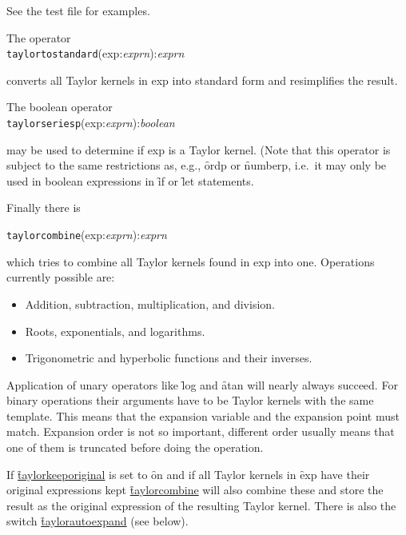 See the test file for examples.

The operator
\hypertarget{operator:TAYLORTOSTANDARD}{}\\
\hspace*{2em} \texttt{taylortostandard}(exp:\emph{exprn}):\emph{exprn}

converts all Taylor kernels in exp into standard form and
 resimplifies the result.

The boolean operator
\hypertarget{operator:TAYLORSERIESP}{}\\
\hspace*{2em} \texttt{taylorseriesp}(exp:\emph{exprn}):\emph{boolean}

may be used to determine if exp is a Taylor kernel.
 (Note that this operator is subject to the same
restrictions as, e.g., \f{ordp} or \f{numberp}, i.e.\ it may only be used in
boolean expressions in \f{if} or \f{let} statements. 

Finally there is

\hypertarget{operator:TAYLORCOMBINE}{}
\hspace*{2em} \texttt{taylorcombine}(exp:\emph{exprn}):\emph{exprn}

which tries to combine all Taylor kernels found in exp into one.
Operations currently possible are:
\begin{itemize}
  \item Addition, subtraction, multiplication, and division.
  \item Roots, exponentials, and logarithms.
  \item Trigonometric and hyperbolic functions and their inverses.
\end{itemize}
Application of unary operators like \f{log} and \f{atan} will
nearly always succeed. For binary operations their arguments have to be
Taylor kernels with the same template. This means that the expansion
variable and the expansion point must match. Expansion order is not so
important, different order usually means that one of them is truncated
before doing the operation.

 
If \hyperlink{switch:TAYLORKEEPORIGINAL}{\f{taylorkeeporiginal}} is set to \f{on} and if all Taylor
kernels in \f{exp} have their original expressions kept
\hyperlink{operator:TAYLORCOMBINE}{\f{taylorcombine}} will also combine these and store the result
as the original expression of the resulting Taylor kernel.
There is also the switch \hyperlink{switch:TAYLORAUTOEXPAND}{\f{taylorautoexpand}} (see below).

